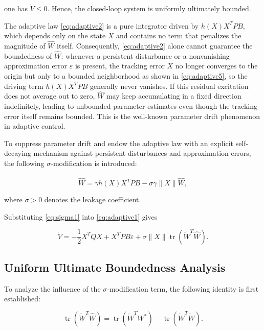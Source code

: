 one has $\dot{V}\le0$. Hence, the closed-loop system is uniformly ultimately bounded.

\begin{remark}
	The adaptive law \eqref{eq:adaptive2} is a pure integrator driven by $h(X)X^{T}PB$, which depends only on the state $X$ and contains no term that penalizes the magnitude of $\hat{W}$ itself. Consequently, \eqref{eq:adaptive2} alone cannot guarantee the boundedness of $\hat{W}$: whenever a persistent disturbance or a nonvanishing approximation error $\varepsilon$ is present, the tracking error $X$ no longer converges to the origin but only to a bounded neighborhood as shown in \eqref{eq:adaptive5}, so the driving term $h(X)X^{T}PB$ generally never vanishes. If this residual excitation does not average out to zero, $\hat{W}$ may keep accumulating in a fixed direction indefinitely, leading to unbounded parameter estimates even though the tracking error itself remains bounded. This is the well-known parameter drift phenomenon in adaptive control.
\end{remark}

To suppress parameter drift and endow the adaptive law with an explicit self-decaying mechanism against persistent disturbances and approximation errors, the following $\sigma$-modification is introduced:

\begin{equation}
	\dot{\hat{W}}
	=
	\gamma
	h(X)
	X^{T}
	PB
	-
	\sigma
	\gamma
	\|X\|
	\hat{W},
	\label{eq:sigma1}
\end{equation}

where $\sigma>0$ denotes the leakage coefficient.

Substituting \eqref{eq:sigma1} into \eqref{eq:adaptive1} gives

\begin{equation}
	\dot{V}
	=
	-
	\frac{1}{2}
	X^{T}QX
	+
	X^{T}PB\varepsilon
	+
	\sigma
	\|X\|
	\operatorname{tr}
	\left(
	\tilde{W}^{T}
	\hat{W}
	\right).
	\label{eq:sigma2}
\end{equation}

\subsection{Uniform Ultimate Boundedness Analysis}

To analyze the influence of the $\sigma$-modification term, the following identity is first established:

\begin{equation}
	\operatorname{tr}
	\left(
	\tilde{W}^{T}\hat{W}
	\right)
	=
	\operatorname{tr}
	\left(
	\tilde{W}^{T}W^{*}
	\right)
	-
	\operatorname{tr}
	\left(
	\tilde{W}^{T}\tilde{W}
	\right).
	\label{eq:uub1}
\end{equation}

